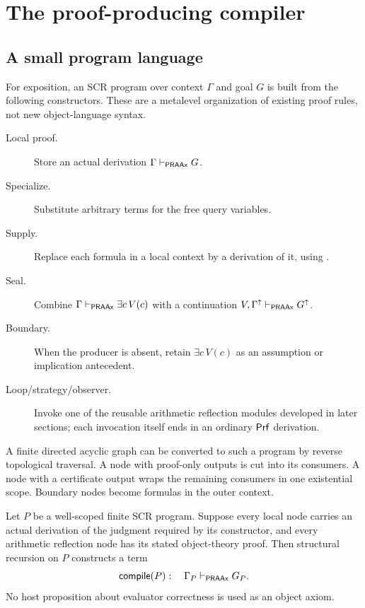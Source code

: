 \section{The proof-producing compiler}
\label{sec:compiler}

\subsection{A small program language}

For exposition, an SCR program over context \(\Gamma\) and goal \(G\) is built
from the following constructors.  These are a metalevel organization of
existing proof rules, not new object-language syntax.

\begin{description}
\item[Local proof.]  Store an actual derivation \(\Gamma\mathrel{\vdash_{\mathsf{PRAAx}}} G\).
\item[Specialize.]  Substitute arbitrary terms for the free query variables.
\item[Supply.]  Replace each formula in a local context by a derivation of it,
using .
\item[Seal.]  Combine \(\Gamma\mathrel{\vdash_{\mathsf{PRAAx}}}\exists c\,V(c)\) with a continuation
\(V,\Gamma^{\mathord{\uparrow}}\mathrel{\vdash_{\mathsf{PRAAx}}} G^{\mathord{\uparrow}}\).
\item[Boundary.]  When the producer is absent, retain
\(\exists c\,V(c)\) as an assumption or implication antecedent.
\item[Loop/strategy/observer.]  Invoke one of the reusable arithmetic
reflection modules developed in later sections; each invocation itself ends in
an ordinary \(\mathsf{Prf}\) derivation.
\end{description}

A finite directed acyclic graph can be converted to such a program by
reverse topological traversal.  A node with proof-only outputs is cut into its
consumers.  A node with a certificate output wraps the remaining consumers in
one existential scope.  Boundary nodes become formulas in the outer context.

\begin{theorem}
\label{thm:compiler}
Let \(P\) be a well-scoped finite SCR program.  Suppose every local node carries
an actual derivation of the judgment required by its constructor, and every
arithmetic reflection node has its stated object-theory proof.  Then structural
recursion on \(P\) constructs a term
\[
        \mathsf{compile}(P):\quad \Gamma_P\mathrel{\vdash_{\mathsf{PRAAx}}} G_P.
\]
No host proposition about evaluator correctness is used as an object axiom.
\end{theorem}

